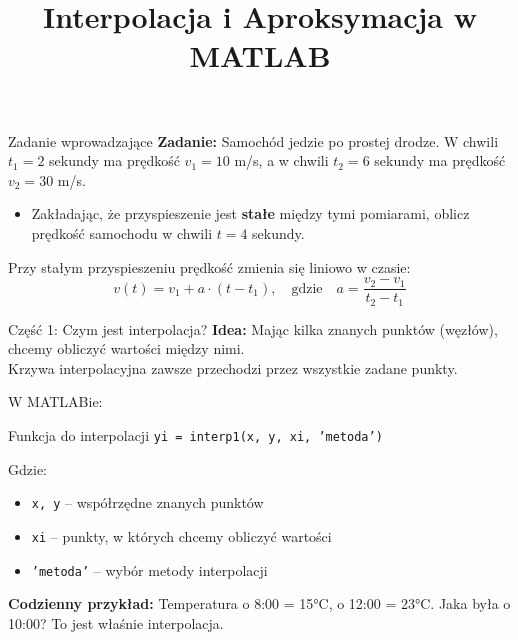\documentclass[11pt,aspectratio=169,table]{beamer}
\title{Interpolacja i Aproksymacja w MATLAB}
\author{}
\date{}
\begin{document}
\begin{frame}
	\titlepage
\end{frame}

\begin{frame}{Zadanie wprowadzające}
	\textbf{Zadanie:} Samochód jedzie po prostej drodze. W chwili $t_1 = 2$ sekundy 
	ma prędkość $v_1 = 10$ m/s, a w chwili $t_2 = 6$ sekundy ma prędkość $v_2 = 30$ m/s.
	
	\vspace{0.5cm}
	\begin{itemize}
		\item Zakładając, że przyspieszenie jest \textbf{stałe} między tymi pomiarami, 
		oblicz prędkość samochodu w chwili $t = 4$ sekundy.
		\vspace{0.3cm}
	\end{itemize}
	
	\vspace{0.5cm}
	\begin{tcolorbox}[colback=yellow!10!white,colframe=yellow!70!black,title=Wskazówka]
	Przy stałym przyspieszeniu prędkość zmienia się liniowo w czasie:
	\[
	v(t) = v_1 + a \cdot (t - t_1), \quad \text{gdzie} \quad a = \frac{v_2 - v_1}{t_2 - t_1}
	\]
	\end{tcolorbox}
\end{frame}

\begin{frame}{Część 1: Czym jest interpolacja?}
	\textbf{Idea:} Mając kilka znanych punktów (węzłów), chcemy obliczyć wartości między nimi. \\
	\alert{Krzywa interpolacyjna zawsze przechodzi przez wszystkie zadane punkty.}
	
	\vspace{0.5cm}
	W MATLABie:
	\begin{block}{Funkcja do interpolacji}
		\centering \texttt{yi = interp1(x, y, xi, 'metoda')}
	\end{block}
	
	Gdzie:
	\begin{itemize}
		\item \texttt{x, y} – współrzędne znanych punktów
		\item \texttt{xi} – punkty, w których chcemy obliczyć wartości
		\item \texttt{'metoda'} – wybór metody interpolacji
	\end{itemize}
	
	\vspace{0.5cm}
	\textbf{Codzienny przykład:} Temperatura o 8:00 = 15°C, o 12:00 = 23°C. 
	Jaka była o 10:00? To jest właśnie interpolacja.
\end{frame}
\end{document}
